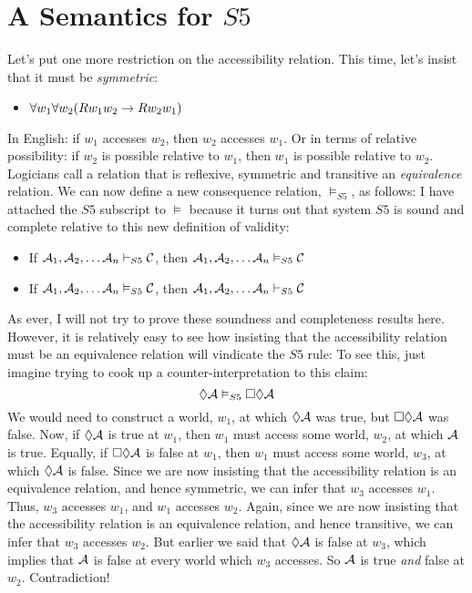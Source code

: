 \section{A Semantics for $S5$}
\label{SemanticsS5}

Let's put one more restriction on the accessibility relation. This time, let's insist that it must be \emph{symmetric}:
\begin{itemize}
\item $\forall w_1\forall w_2(Rw_1w_2 \rightarrow Rw_2w_1)$
\end{itemize}
In English: if $w_1$ accesses $w_2$, then $w_2$ accesses $w_1$. Or in terms of relative possibility: if $w_2$ is possible relative to $w_1$, then $w_1$ is possible relative to $w_2$. Logicians call a relation that is reflexive, symmetric and transitive an \emph{equivalence} relation. We can now define a new consequence relation, $\vDash_{S5}$, as follows:
I have attached the $S5$ subscript to $\vDash$ because it turns out that system $S5$ is sound and complete relative to this new definition of validity:
\begin{itemize}
\item If $\mathcal{A}_1,\mathcal{A}_2, \dots \mathcal{A}_n\vdash_{S5}\mathcal{C}$, then $\mathcal{A}_1,\mathcal{A}_2, \dots \mathcal{A}_n\vDash_{S5}\mathcal{C}$
\item If $\mathcal{A}_1,\mathcal{A}_2, \dots \mathcal{A}_n\vDash_{S5}\mathcal{C}$, then $\mathcal{A}_1,\mathcal{A}_2, \dots \mathcal{A}_n\vdash_{S5}\mathcal{C}$
\end{itemize}
As ever, I will not try to prove these soundness and completeness results here. However, it is relatively easy to see how insisting that the accessibility relation must be an equivalence relation will vindicate the $S5$ rule:
To see this, just imagine trying to cook up a counter-interpretation to this claim:
\[
\Diamond\mathcal{A} \vDash_{S5} \Box \Diamond \mathcal{A}
\]
We would need to construct a world, $w_1$, at which $\Diamond\mathcal{A}$ was true, but $\Box \Diamond \mathcal{A}$ was false. Now, if $\Diamond\mathcal{A}$ is true at $w_1$, then $w_1$ must access some world, $w_2$, at which $\mathcal{A}$ is true. Equally, if $\Box \Diamond \mathcal{A}$ is false at $w_1$, then $w_1$ must access some world, $w_3$, at which $\Diamond \mathcal{A}$ is false. Since we are now insisting that the accessibility relation is an equivalence relation, and hence symmetric, we can infer that $w_3$ accesses $w_1$. Thus, $w_3$ accesses $w_1$, and $w_1$ accesses $w_2$. Again, since we are now insisting that the accessibility relation is an equivalence relation, and hence transitive, we can infer that $w_3$ accesses $w_2$. But earlier we said that $\Diamond \mathcal{A}$ is false at $w_3$, which implies that $\mathcal{A}$ is false at every world which $w_3$ accesses. So $\mathcal{A}$ is true \emph{and} false at $w_2$. Contradiction!

